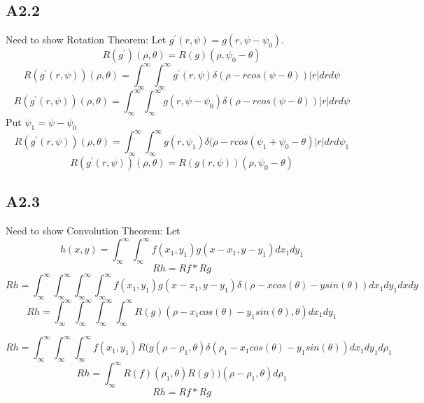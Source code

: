 \documentclass{article}
\newcommand{\dbint}{
  \int_{\infty}^{\infty}\int_{\infty}^{\infty}
}
\begin{document}
\subsection*{A2.2}
Need to show Rotation Theorem:
Let $g^{'}(r,\psi) = g(r,\psi - \psi_0). $
\begin{equation}
  \label{eq:2}
  R(g^{'})(\rho,\theta) = R(g)(\rho,\psi_0 - \theta)
\end{equation}
$$R(g^{'}(r,\psi))(\rho,\theta) = \dbint g^{'}(r,\psi)\delta(\rho - rcos(\psi - \theta))|r|drd\psi$$
$$R(g^{'}(r,\psi))(\rho,\theta) = \dbint g(r,\psi - \psi_0)\delta(\rho - rcos(\psi - \theta))|r|drd\psi$$
Put $\psi_1 = \psi - \psi_0$
$$R(g^{'}(r,\psi))(\rho,\theta) = \dbint g(r,\psi_1)\delta(\rho - rcos(\psi_1 + \psi_0 - \theta)|r|drd\psi_1$$
$$R(g^{'}(r,\psi))(\rho,\theta) = R(g(r,\psi))(\rho,\psi_0 - \theta)$$

\subsection*{A2.3}
Need to show Convolution Theorem:
Let $$h(x,y) = \dbint f(x_1,y_1)g(x - x_1,y - y_1)dx_1dy_1$$
\begin{equation}
  \label{eq:3}
  Rh = Rf * Rg
\end{equation}
$$Rh = \dbint\dbint f(x_1,y_1)g(x-x_1,y-y_1)\delta(\rho - xcos(\theta) - ysin(\theta))dx_1dy_1dxdy$$
$$Rh = \dbint \dbint R(g)(\rho - x_1cos(\theta) - y_1sin(\theta),\theta) dx_1dy_1$$

$$Rh = \dbint \int_{\infty}^{\infty}f(x_1,y_1)R(g(\rho-\rho_1,\theta)\delta(\rho_1 - x_1cos(\theta) - y_1sin(\theta))dx_1dy_1d\rho_1$$
$$Rh = \int_{\infty}^{\infty}R(f)(\rho_1,\theta)R(g))(\rho - \rho_1,\theta)d\rho_1$$
$$Rh = Rf * Rg$$
\end{document}
